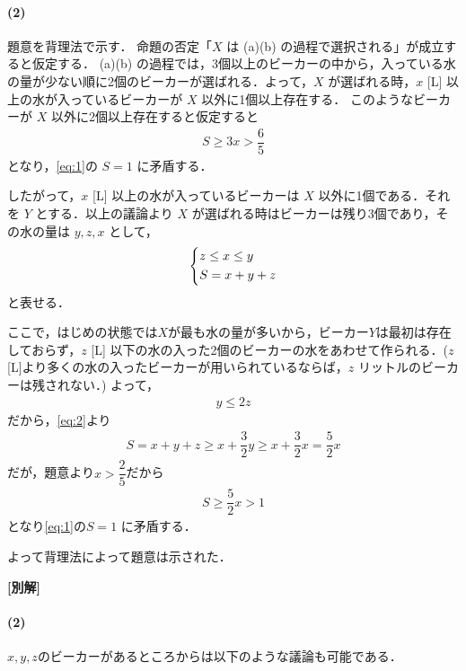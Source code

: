 \documentclass[../../main.tex]{subfiles}
\begin{document}
\paragraph{(2)}

題意を背理法で示す．
命題の否定「$X$ は (a)(b) の過程で選択される」が成立すると仮定する．
(a)(b) の過程では，3個以上のビーカーの中から，入っている水の量が少ない順に2個のビーカーが選ばれる．よって，$X$ が選ばれる時，$x$ [L] 以上の水が入っているビーカーが $X$ 以外に1個以上存在する．
このようなビーカーが $X$ 以外に2個以上存在すると仮定すると
\begin{align}
  S \ge 3x > \dfrac{6}{5}
\end{align}
となり，\cref{eq:1}の $S=1$ に矛盾する．

したがって，$x$ [L] 以上の水が入っているビーカーは $X$ 以外に1個である．それを $Y$ とする．以上の議論より $X$ が選ばれる時はビーカーは残り3個であり，その水の量は $y, z, x$ として，
\begin{align}
  \begin{dcases}
    z \le x \le y \\
    S=x+y+z
  \end{dcases}\label{eq:2}
\end{align}
と表せる．

ここで，はじめの状態では$X$が最も水の量が多いから，ビーカー$Y$は最初は存在しておらず，$z$ [L] 以下の水の入った2個のビーカーの水をあわせて作られる．($z$ [L]より多くの水の入ったビーカーが用いられているならば，$z$ リットルのビーカーは残されない．)
よって，
\begin{align}
  y \le 2z
\end{align}
だから，\cref{eq:2}より
\begin{align}
  S = x + y + z \ge x + \dfrac{3}{2}y \ge x+\dfrac{3}{2}x = \dfrac{5}{2}x
\end{align}
だが，題意より$x>\dfrac{2}{5}$だから
\begin{align}
  S \ge \dfrac{5}{2}x > 1
\end{align}
となり\cref{eq:1}の$S=1$ に矛盾する．

よって背理法によって題意は示された．

{\bf [別解]}

\paragraph{(2)}

$x,y,z$のビーカーがあるところからは以下のような議論も可能である．
\end{document}
